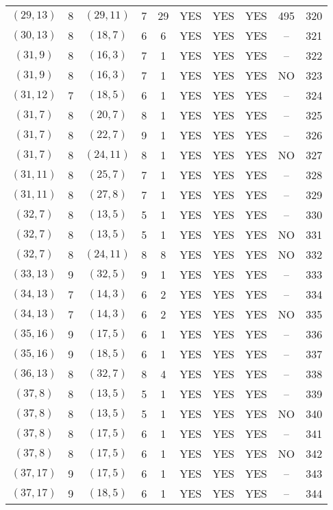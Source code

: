 \begin{longtable}{|c|c|c|c|c|c|c|c|c|c|}
$(29, 13)$ & 8 & $(29, 11)$ & 7 & 29 & YES & YES & YES & 495 & 320\\
$(30, 13)$ & 8 & $(18, 7)$ & 6 & 6 & YES & YES & YES & -- & 321\\
$(31, 9)$ & 8 & $(16, 3)$ & 7 & 1 & YES & YES & YES & -- & 322\\
$(31, 9)$ & 8 & $(16, 3)$ & 7 & 1 & YES & YES & YES & NO & 323\\
$(31, 12)$ & 7 & $(18, 5)$ & 6 & 1 & YES & YES & YES & -- & 324\\
$(31, 7)$ & 8 & $(20, 7)$ & 8 & 1 & YES & YES & YES & -- & 325\\
$(31, 7)$ & 8 & $(22, 7)$ & 9 & 1 & YES & YES & YES & -- & 326\\
$(31, 7)$ & 8 & $(24, 11)$ & 8 & 1 & YES & YES & YES & NO & 327\\
$(31, 11)$ & 8 & $(25, 7)$ & 7 & 1 & YES & YES & YES & -- & 328\\
$(31, 11)$ & 8 & $(27, 8)$ & 7 & 1 & YES & YES & YES & -- & 329\\
$(32, 7)$ & 8 & $(13, 5)$ & 5 & 1 & YES & YES & YES & -- & 330\\
$(32, 7)$ & 8 & $(13, 5)$ & 5 & 1 & YES & YES & YES & NO & 331\\
$(32, 7)$ & 8 & $(24, 11)$ & 8 & 8 & YES & YES & YES & NO & 332\\
$(33, 13)$ & 9 & $(32, 5)$ & 9 & 1 & YES & YES & YES & -- & 333\\
$(34, 13)$ & 7 & $(14, 3)$ & 6 & 2 & YES & YES & YES & -- & 334\\
$(34, 13)$ & 7 & $(14, 3)$ & 6 & 2 & YES & YES & YES & NO & 335\\
$(35, 16)$ & 9 & $(17, 5)$ & 6 & 1 & YES & YES & YES & -- & 336\\
$(35, 16)$ & 9 & $(18, 5)$ & 6 & 1 & YES & YES & YES & -- & 337\\
$(36, 13)$ & 8 & $(32, 7)$ & 8 & 4 & YES & YES & YES & -- & 338\\
$(37, 8)$ & 8 & $(13, 5)$ & 5 & 1 & YES & YES & YES & -- & 339\\
$(37, 8)$ & 8 & $(13, 5)$ & 5 & 1 & YES & YES & YES & NO & 340\\
$(37, 8)$ & 8 & $(17, 5)$ & 6 & 1 & YES & YES & YES & -- & 341\\
$(37, 8)$ & 8 & $(17, 5)$ & 6 & 1 & YES & YES & YES & NO & 342\\
$(37, 17)$ & 9 & $(17, 5)$ & 6 & 1 & YES & YES & YES & -- & 343\\
$(37, 17)$ & 9 & $(18, 5)$ & 6 & 1 & YES & YES & YES & -- & 344\\

\end{longtable}
